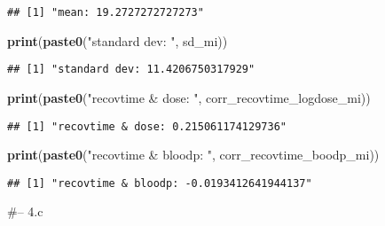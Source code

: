 \documentclass[
]{article}
\newenvironment{Shaded}{\begin{snugshade}}{\end{snugshade}}
\newcommand{\CommentTok}[1]{\textcolor[rgb]{0.56,0.35,0.01}{\textit{#1}}}
\newcommand{\DataTypeTok}[1]{\textcolor[rgb]{0.13,0.29,0.53}{#1}}
\newcommand{\KeywordTok}[1]{\textcolor[rgb]{0.13,0.29,0.53}{\textbf{#1}}}
\newcommand{\NormalTok}[1]{#1}
\newcommand{\OperatorTok}[1]{\textcolor[rgb]{0.81,0.36,0.00}{\textbf{#1}}}
\newcommand{\StringTok}[1]{\textcolor[rgb]{0.31,0.60,0.02}{#1}}
\begin{document}
\begin{verbatim}
## [1] "mean: 19.2727272727273"
\end{verbatim}

\begin{Shaded}
\begin{Highlighting}[]
\KeywordTok{print}\NormalTok{(}\KeywordTok{paste0}\NormalTok{(}\StringTok{"standard dev: "}\NormalTok{, sd_mi))}
\end{Highlighting}
\end{Shaded}

\begin{verbatim}
## [1] "standard dev: 11.4206750317929"
\end{verbatim}

\begin{Shaded}
\begin{Highlighting}[]
\KeywordTok{print}\NormalTok{(}\KeywordTok{paste0}\NormalTok{(}\StringTok{"recovtime & dose: "}\NormalTok{, corr_recovtime_logdose_mi))}
\end{Highlighting}
\end{Shaded}

\begin{verbatim}
## [1] "recovtime & dose: 0.215061174129736"
\end{verbatim}

\begin{Shaded}
\begin{Highlighting}[]
\KeywordTok{print}\NormalTok{(}\KeywordTok{paste0}\NormalTok{(}\StringTok{"recovtime & bloodp: "}\NormalTok{, corr_recovtime_boodp_mi))}
\end{Highlighting}
\end{Shaded}

\begin{verbatim}
## [1] "recovtime & bloodp: -0.0193412641944137"
\end{verbatim}

\#-- 4.c

\begin{Shaded}
\end{Shaded}
\end{document}
